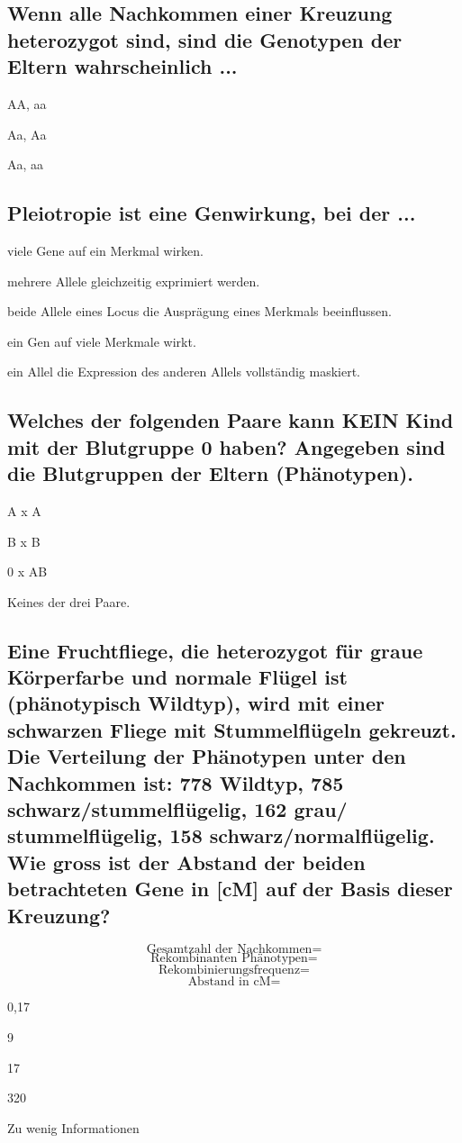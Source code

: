 \documentclass{article}
\begin{document}
\subsection*{Wenn alle Nachkommen einer Kreuzung heterozygot sind, sind die
Genotypen der Eltern wahrscheinlich ...}
\begin{todolist} %
\item  AA, aa  
\item Aa, Aa  
\item Aa, aa 
\end{todolist}
\subsection*{Pleiotropie ist eine Genwirkung, bei der ...}
\begin{todolist}%
\item viele Gene auf ein Merkmal wirken.  
\item mehrere Allele gleichzeitig exprimiert werden.  
\item beide Allele eines Locus die Ausprägung eines Merkmals
beeinflussen.  
\item ein Gen auf viele Merkmale wirkt.
\item ein Allel die Expression des anderen Allels vollständig maskiert.  
\end{todolist}
\subsection*{Welches der folgenden Paare kann KEIN Kind mit der Blutgruppe 0
haben? Angegeben sind die Blutgruppen der Eltern (Phänotypen).}
\begin{todolist} %
\item  A x A
\item  B x B
\item  0 x AB
\item Keines der drei Paare.
\end{todolist}
\subsection*{Eine Fruchtfliege, die heterozygot für graue Körperfarbe und normale
Flügel ist (phänotypisch Wildtyp), wird mit einer schwarzen Fliege mit
Stummelflügeln gekreuzt. Die Verteilung der Phänotypen unter den
Nachkommen ist: 778 Wildtyp, 785 schwarz/stummelflügelig, 162 grau/
stummelflügelig, 158 schwarz/normalflügelig. Wie gross ist der Abstand
der beiden betrachteten Gene in [cM] auf der Basis dieser Kreuzung?}
\[
   \text{Gesamtzahl der Nachkommen} =
   \]
   \[
   \text{Rekombinanten Phänotypen} = 
   \]
   \[
   \text{Rekombinierungsfrequenz} = 
   \]
   \[
   \text{Abstand in cM} = 
   \]
\begin{todolist} %
\item 0,17
\item 9
\item 17
\item 320
\item Zu wenig Informationen 
\end{todolist}
\end{document}
